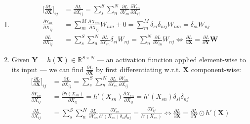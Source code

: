 \documentclass[11pt]{article}
\begin{document}
\begin{enumerate}[label=1\alph*]
\item
  \begin{align*}
    {\Big[\frac{\partial L}{\partial \mathbf{X}}\Big]}_{ij} &= \frac{\partial L}{\partial X_{ij}} =
                                                \sum_s^S \sum_n^N \frac{\partial L}{\partial
                                                Y_{sn}}\frac{\partial Y_{sn}}{\partial
                                                X_{ij}} \\
    \frac{\partial Y_{sn}}{\partial X_{ij}} &=
                                \sum_{m}^{M}\frac{\partial
                                X_{sm}}{\partial X_{ij}}W_{nm} + 0
                                =
                                \sum_{m}^{M}\delta_{si}\delta_{mj}W_{nm}
                                = \delta_{si}W_{nj} \\
    \frac{\partial L}{\partial X_{ij}} &= \sum_s^S \sum_n^N \frac{\partial
                           L}{\partial
                           Y_{sn}}\delta_{si}W_{nj} =
                           \sum_n^N\frac{\partial
                           L}{\partial Y_{in}}W_{nj}
                           \Leftrightarrow \frac{\partial
                           L}{\partial \mathbf{X}} =
                           \frac{\partial L}{\partial \mathbf{Y}}\mathbf{W}
  \end{align*}

\item
  Given $\mathbf{Y}=h(\mathbf{X})\in\mathbb{R}^{S\times N}$ --- an activation function
  applied element-wise to its input --- we can find $\frac{\partial L}{\partial
    \mathbf{X}}$ by first differentiating w.r.t. $\mathbf{X}$
  component-wise:
  \begin{align*}
    {\Big[\frac{\partial L}{\partial \mathbf{X}}\Big]}_{ij} &= \frac{\partial L}{\partial X_{ij}} =
                                                \sum_s^S \sum_n^N \frac{\partial L}{\partial
                                                Y_{sn}}\frac{\partial Y_{sn}}{\partial
                                                X_{ij}} \\
    \frac{\partial Y_{sn}}{\partial X_{ij}} &= \frac{\partial h(X_{sn})}{\partial X_{ij}} =
                                h'(X_{sn})\frac{\partial X_{sn}}{\partial X_{ij}} =
                                h'(X_{sn})\delta_{si}\delta_{nj} \\
    \frac{\partial L}{\partial X_{ij}} &= \sum_s^S \sum_n^N \frac{\partial L}{\partial Y_{sn}}\frac{\partial
                           Y_{sn}}{h'(X_{sn})\delta_{si}\delta_{nj}} = \frac{\partial
                           Y_{ij}}{h'(X_{sn})} \Leftrightarrow \frac{\partial
                           L}{\partial \mathbf{X}} = \frac{\partial L}{\partial
                           \mathbf{Y}}\odot h'(\mathbf{X})
  \end{align*}


\end{enumerate}
\end{document}

